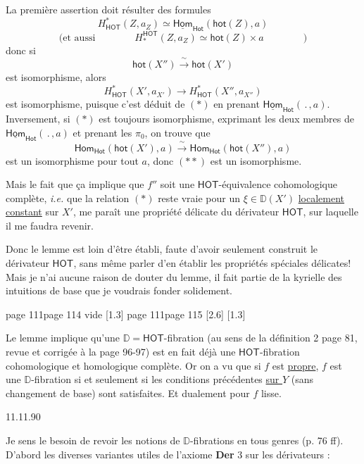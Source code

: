 \documentclass[11pt,leqno]{article}
\newcommand{\printedpage}[1]{\marginnote{\scriptsize\sffamily ed.\ #1}}
\newcommand{\msp}[1]{%
  \begingroup\def\thismsp{#1}\def\blankmsp{page 114 vide}%
  \ifx\thismsp\blankmsp
    \marginnote{\scriptsize\sffamily [114: vide]}[1.3\baselineskip]%
  \else\def\followingmsp{page 115}%
    \ifx\thismsp\followingmsp
      \marginnote{\scriptsize\sffamily [page 115]}[2.6\baselineskip]%
    \else\marginnote{\scriptsize\sffamily [#1]}[1.3\baselineskip]\fi
  \fi\endgroup}
\newcommand{\DD}{\ensuremath{\mathbb{D}}}
\newcommand{\HOT}{\ensuremath{\mathsf{HOT}}}
\begin{document}
La première assertion doit résulter des formules
\[ H^{*}_{\mathsf{HOT}}(Z,a_Z) \simeq \underline{\mathsf{Hom}}_{\mathsf{Hot}}(\mathsf{hot}(Z),a) \tag*{$(*)$} \]
\[ \text{(et aussi} \qquad\qquad H_{*}^{\mathsf{HOT}}(Z,a_Z) \simeq \mathsf{hot}(Z) \times a \qquad\qquad ) \]
donc si
\[ \mathsf{hot}(X'') \xrightarrow{\ \sim\ } \mathsf{hot}(X') \tag*{$(**)$} \]
est isomorphisme, alors
\[ H^{*}_{\mathsf{HOT}}(X', a_{X'}) \longrightarrow H^{*}_{\mathsf{HOT}}(X'', a_{X''}) \]
est isomorphisme, puisque c'est déduit de $(*)$ en prenant $\underline{\mathsf{Hom}}_{\mathsf{Hot}}(\,.\,,a)$. Inversement, si $(*)$ est toujours isomorphisme, exprimant les deux membres de $\underline{\mathsf{Hom}}_{\mathsf{Hot}}(\,.\,,a)$ et prenant les $\pi_0$, on trouve que
\[ \mathsf{Hom}_{\mathsf{Hot}}(\mathsf{hot}(X'),a) \xrightarrow{\ \sim\ } \mathsf{Hom}_{\mathsf{Hot}}(\mathsf{hot}(X''),a) \]
est un isomorphisme pour tout $a$, donc $(**)$ est un isomorphisme.

Mais le fait que ça implique que $f''$ soit une \HOT-équivalence cohomologique complète, \textit{i.e.} que la relation $(*)$ reste vraie pour un $\xi \in \DD(X')$ \underline{localement} \underline{constant} sur $X'$, me paraît une propriété délicate du dérivateur \HOT, sur laquelle il me faudra revenir.

Donc le lemme est loin d'être établi, faute d'avoir seulement construit le dérivateur \HOT, sans même parler d'en établir les propriétés spéciales délicates! Mais je n'ai aucune raison de douter du lemme, il fait partie de la kyrielle des intuitions de base que je voudrais fonder solidement.

\printedpage{66}

\msp{page 111}

Le lemme implique qu'une $\DD = \mathsf{HOT}$-fibration (au sens de la définition 2 page 81, revue et corrigée à la page 96-97) est en fait déjà une \HOT-fibration cohomologique et homologique complète. Or on a vu que si $f$ est \underline{propre}, $f$ est une $\DD$-fibration si et seulement si les conditions précédentes \underline{sur $Y$} (sans changement de base) sont satisfaites. Et dualement pour $f$ lisse.

\begin{flushright}
11.11.90
\end{flushright}

Je sens le besoin de revoir les notions de $\DD$-fibrations en tous genres (p. 76 ff). D'abord les diverses variantes utiles de l'axiome \textbf{Der} 3 sur les dérivateurs :
\end{document}
